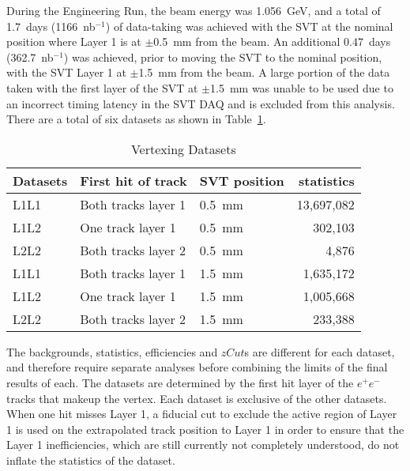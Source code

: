 During the Engineering Run, the beam energy was 1.056~GeV, and a total of 1.7~days (1166~nb$^{-1}$) of data-taking was achieved with the SVT at the nominal position where Layer 1 is at $\pm$0.5~mm from the beam. An additional 0.47~days (362.7~nb$^{-1}$) was achieved, prior to moving the SVT to the nominal position, with the SVT Layer 1 at $\pm$1.5~mm from the beam. A large portion of the data taken with the first layer of the SVT at $\pm$1.5~mm was unable to be used due to an incorrect timing latency in the SVT DAQ and is excluded from this analysis. There are a total of six datasets as shown in Table~\ref{tab:datasets}.

\begin{table}[htb]
\caption{Vertexing Datasets}
\label{tab:datasets}
\centering
\begin{tabular}{lllr}
\toprule
Datasets &First hit of track & SVT position & statistics \\
\midrule
L1L1 & Both tracks layer 1 & 0.5~mm & 13,697,082\\
L1L2 & One track layer 1 & 0.5~mm & 302,103\\
L2L2 & Both tracks layer 2 & 0.5~mm & 4,876\\
L1L1 & Both tracks layer 1 & 1.5~mm & 1,635,172\\
L1L2 & One track layer 1 & 1.5~mm & 1,005,668\\
L2L2 & Both tracks layer 2 & 1.5~mm & 233,388\\
\bottomrule
\end{tabular}
\end{table}

The backgrounds, statistics, efficiencies and $zCut$s are different for each dataset, and therefore require separate analyses before combining the limits of the final results of each. The datasets are determined by the first hit layer of the $e^+e^-$ tracks that makeup the vertex. Each dataset is exclusive of the other datasets. When one hit misses Layer 1, a fiducial cut to exclude the active region of Layer 1 is used on the extrapolated track position to Layer 1 in order to ensure that the Layer 1 inefficiencies, which are still currently not completely understood, do not inflate the statistics of the dataset. 